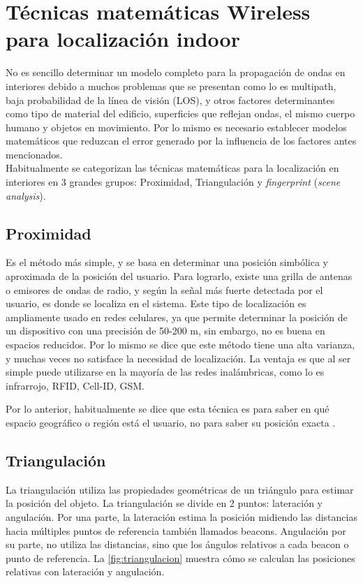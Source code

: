 \section{Técnicas  matemáticas Wireless para localización indoor}

No es sencillo determinar un modelo completo para la propagación de ondas en interiores debido a muchos problemas que se presentan como lo es multipath, baja probabilidad de la línea de visión (LOS), y otros factores determinantes como tipo de material del edificio, superficies que reflejan ondas, el mismo cuerpo humano y objetos en movimiento. Por lo mismo es necesario establecer modelos matemáticos que reduzcan el error generado por la influencia de los factores antes mencionados.\\

Habitualmente se categorizan las técnicas matemáticas para la localización en interiores en 3 grandes grupos: Proximidad, Triangulación y \textit{fingerprint} (\textit{scene analysis}).

\subsection{Proximidad}

Es el método más simple, y se basa en determinar una posición simbólica y aproximada de la posición del usuario. Para lograrlo, existe una grilla de antenas o emisores de ondas de radio, y según la señal más fuerte detectada por el usuario, es donde se localiza en el sistema. Este tipo de localización es ampliamente usado en redes celulares, ya que permite determinar la posición de un dispositivo con una precisión de 50-200 m, sin embargo, no es buena en espacios reducidos. Por lo mismo se dice que este método tiene una alta varianza, y muchas veces no satisface la necesidad de localización. La ventaja es que al ser simple puede utilizarse en la mayoría de las redes inalámbricas, como lo es infrarrojo, RFID, Cell-ID, GSM.

Por lo anterior, habitualmente se dice que esta técnica es para saber en qué espacio geográfico o región está el usuario, no para saber su posición exacta \citep{Liu:2007:SWI:2220431.2221077}.

\subsection{Triangulación}

La triangulación utiliza las propiedades geométricas de un triángulo para estimar la posición del objeto.  La triangulación se divide en 2 puntos: lateración y angulación. Por una parte, la lateración estima la posición midiendo las distancias hacia múltiples puntos de referencia también llamados beacons. Angulación por su parte, no utiliza las distancias, sino que los ángulos relativos a cada beacon o punto de referencia. La  \autoref{fig:triangulacion} muestra cómo se calculan las posiciones relativas con lateración y angulación.

